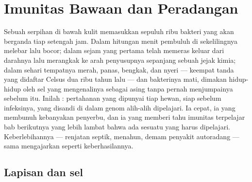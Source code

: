 \chapter{Imunitas Bawaan dan Peradangan}\label{ch:b3:innate-immunity}

Sebuah serpihan di bawah kulit memasukkan sepuluh ribu bakteri yang akan
berganda tiap setengah jam. Dalam hitungan menit pembuluh di sekelilingnya
melebar lalu bocor; dalam sejam  yang pertama telah memeras keluar
dari darahnya lalu merangkak ke arah penyusupnya sepanjang sebuah jejak kimia;
dalam sehari tempatnya merah, panas, bengkak, dan nyeri --- keempat
tanda  yang didaftar Celsus dua ribu tahun lalu --- dan
bakterinya mati, dimakan hidup-hidup oleh sel yang mengenalinya sebagai
asing tanpa pernah menjumpainya sebelum itu. Inilah :
pertahanan yang dipunyai tiap hewan, siap sebelum infeksinya, yang disandi di
dalam genom alih-alih dipelajari. Ia cepat, ia yang membunuh kebanyakan
penyerbu, dan ia yang memberi tahu imunitas terpelajar bab berikutnya yang
lebih lambat bahwa ada sesuatu yang harus dipelajari. Keberlebihannya ---
renjatan septik,  menahun, demam penyakit autoradang --- sama
mengajarkan seperti keberhasilannya.

\section{Lapisan dan sel}

